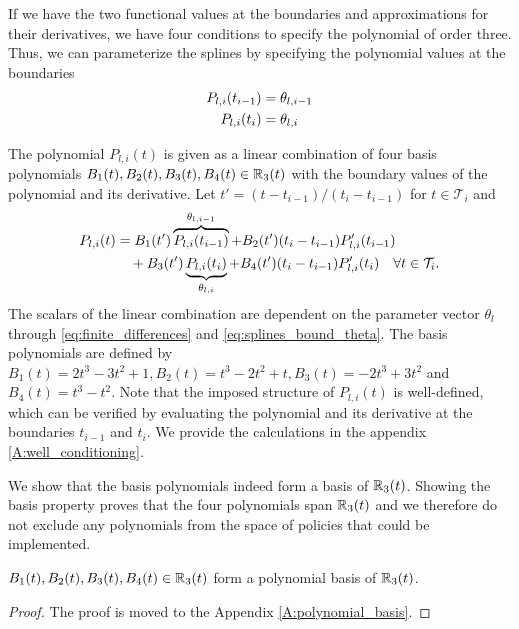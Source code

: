 If we have the two functional values at the boundaries and approximations for their derivatives, we have four conditions to specify the polynomial of order three. Thus, we can parameterize the splines by specifying the polynomial values at the boundaries 
\begin{align}
\label{eq:splines_bound_theta}
P_{l,i}(t_{i-1}) &= \theta_{l, i-1} \\
P_{l,i}(t_{i}) &= \theta_{l,i} \notag
\end{align}

The polynomial $P_{l,i}(t) $ is given as a linear combination of four basis polynomials  $B_1(t), B_2(t), B_3(t), B_4(t) \in \mathbb{R}_3(t)$ with the boundary values of the polynomial and its derivative. Let $t' = (t-t_{i-1})/(t_{i} - t_{i-1})$ for $t \in \mathcal{T}_i$ and
\begin{align}
P_{l,i}(t) &= B_1(t') \overbrace{P_{l,i}(t_{i-1})}^{\theta_{l,i-1}} + B_2(t') (t_{i} - t_{i-1}) P'_{l,i}(t_{i-1})  \\& \quad + B_3(t') \underbrace{P_{l,i}(t_{i})}_{\theta_{l,i}} + B_4(t') (t_{i} - t_{i-1}) P'_{l,i}(t_{i}) \quad \forall t \in \mathcal{T}_i. \notag
\end{align}
The scalars of the linear combination are dependent on the parameter vector $\theta_l$ through \eqref{eq:finite_differences} and \eqref{eq:splines_bound_theta}. The basis polynomials are defined by $B_1(t) = 2t^3 - 3t^2 +1, B_2(t) = t^3 - 2t^2 +t, B_3(t) = -2t^3 + 3t^2$ and $B_4(t) = t^3 - t^2$. Note that the imposed structure of $P_{l,i}(t)$ is well-defined, which can be verified by evaluating the polynomial and its derivative at the boundaries $t_{i-1}$ and $t_i$. We provide the calculations in the appendix \ref{A:well_conditioning}.

We show that the basis polynomials indeed form a basis of $\mathbb{R}_3(t)$. Showing the basis property proves that the four polynomials span $\mathbb{R}_3(t)$ and we therefore do not exclude any polynomials from the space of policies that could be implemented.
\begin{theorem}
$B_1(t), B_2(t), B_3(t), B_4(t) \in \mathbb{R}_3(t)$ form a polynomial basis of $\mathbb{R}_3(t)$.
\end{theorem}
\begin{proof}
The proof is moved to the Appendix \ref{A:polynomial_basis}.
\end{proof} 


 
